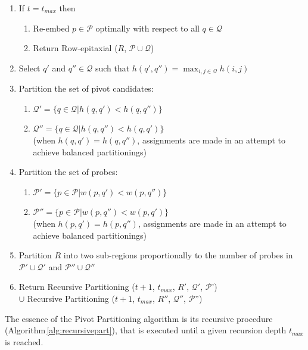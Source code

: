 \documentclass{llncs}
\begin{document}
\begin{algorithm}
\begin{minipage}{4.8in}
\begin{enumerate}
\item If $t = t_{max}$ then
  \begin{enumerate}
    \item Re-embed $p \in \mathcal{P}$ optimally with respect to all $q \in \mathcal{Q}$
    \item Return Row-epitaxial ($R$, $\mathcal{P} \cup \mathcal{Q}$)
  \end{enumerate}
\item Select $q'$ and $q'' \in \mathcal{Q}$ such that $h(q',q'') = \max_{i,j \in \mathcal{Q}} h(i,j)$
\item \label{step:part_pivots} Partition the set of pivot candidates:
  \begin{enumerate}
    \item $\mathcal{Q}' = \{q \in \mathcal{Q} | h(q,q') < h(q,q'')\}$
    \item $\mathcal{Q}'' = \{q \in \mathcal{Q} | h(q,q'') < h(q,q')\}$ \\
    (when $h(q,q') = h(q,q'')$, assignments are made in an attempt to
    achieve balanced partitionings)
  \end{enumerate}
\item Partition the set of probes:
  \begin{enumerate}
    \item $\mathcal{P}' = \{p \in \mathcal{P} | w(p,q') < w(p,q'')\}$
    \item $\mathcal{P}'' = \{p \in \mathcal{P} | w(p,q'') < w(p,q')\}$ \\
    (when $h(p,q') = h(p,q'')$, assignments are made in an attempt to
    achieve balanced partitionings)
  \end{enumerate}
\item \label{step:part_r} Partition $R$ into two sub-regions proportionally to the number of probes
      in $\mathcal{P}' \cup \mathcal{Q}'$ and $\mathcal{P}'' \cup \mathcal{Q}''$
\item Return Recursive Partitioning ($t + 1$, $t_{max}$, $R'$, $\mathcal{Q}'$, $\mathcal{P}$') \\
      $\cup$ Recursive Partitioning ($t + 1$, $t_{max}$, $R''$, $\mathcal{Q}''$, $\mathcal{P}$'')
\end{enumerate}

\end{minipage}
\end{algorithm}

The essence of the Pivot Partitioning algorithm is its recursive procedure
(Algorithm\,\ref{alg:recursivepart}), that is executed until a given
recursion depth $t_{max}$ is reached.
\end{document}
